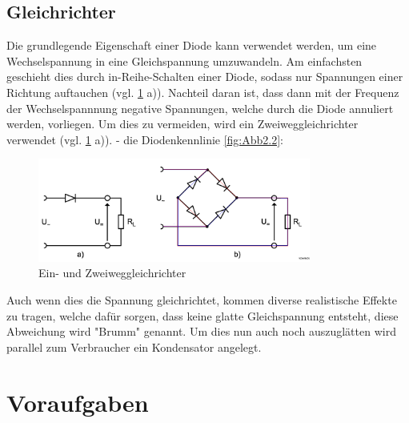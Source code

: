 \documentclass{article}
\theoremstyle{definition}
\begin{document}
    \subsection{Gleichrichter}
    Die grundlegende Eigenschaft einer Diode kann verwendet werden, um eine Wechselspannung in eine Gleichspannung umzuwandeln. Am einfachsten geschieht dies durch in-Reihe-Schalten einer Diode, sodass nur Spannungen einer Richtung auftauchen (vgl. \ref{fig:Abb2.4mod} a)). Nachteil daran ist, dass dann mit der Frequenz der Wechselspannnung negative Spannungen, welche durch die Diode annuliert werden, vorliegen. Um dies zu vermeiden, wird ein Zweiweggleichrichter verwendet (vgl. \ref{fig:Abb2.4mod} a)).
    - die Diodenkennlinie \ref{fig:Abb2.2}:
    \begin{figure}[H]
        \centering
        \includegraphics[width=0.8\textwidth]{figs/fig2_4mod.png}
        \caption{Ein- und Zweiweggleichrichter\cite{anleitung}}
        \label{fig:Abb2.4mod}
    \end{figure}

    

    Auch wenn dies die Spannung gleichrichtet, kommen diverse realistische Effekte zu tragen, welche dafür sorgen, dass keine glatte Gleichspannung entsteht, diese Abweichung wird "Brumm" genannt. Um dies nun auch noch auszuglätten wird parallel zum Verbraucher ein Kondensator angelegt.
\section{Voraufgaben}
\end{document}
